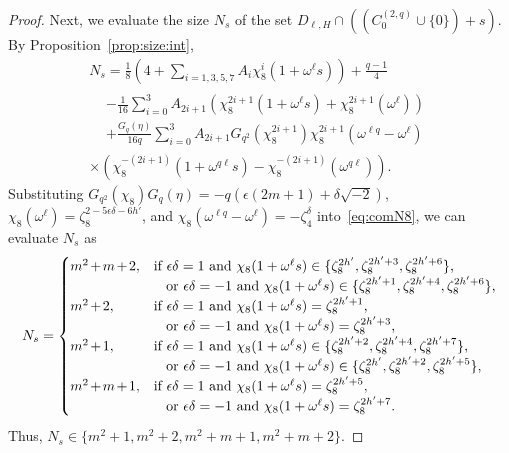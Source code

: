 \documentclass[10pt]{amsart}
\theoremstyle{definition}
\newcommand*{\Mk}{\mkern -2mu}
\begin{document}
\begin{proof}
Next, we evaluate the size $N_s$ of the set $D_{\ell,H}\cap ((C_0^{(2,q)}\cup \{0\})+s)$. By Proposition~\ref{prop:size:int},
\begin{multline}
N_s= \frac{1}{8}\left(4+\sum_{i=1,3,5,7}A_i\chi_8^i(1+\omega^\ell s)\right)+\frac{q-1}{4}\\
\begin{aligned}
&-\frac{1}{16}\sum_{i=0}^{3} A_{2i+1}(\chi_8^{2i+1}(1+\omega^\ell s)+\chi_8^{2i+1}(\omega^\ell))\\
&+\frac{G_q(\eta)}{16q}\sum_{i=0}^{3}A_{2i+1} G_{q^2}(\chi_8^{2i+1})\chi_8^{2i+1}(\omega^{\ell q}-\omega^\ell)
\end{aligned}\\
\times (\chi_8^{-(2i+1)}(1+\omega^{q\ell} s)-\chi_8^{-(2i+1)}(\omega^{q\ell})).\label{eq:comN8}
\end{multline}
Substituting $G_{q^2}(\chi_8)G_q(\eta)=-q(\epsilon (2m+1)+\delta \sqrt{-2})$, $\chi_8(\omega^\ell)=\zeta_8^{2-5\epsilon \delta-6h'}$, and $\chi_8(\omega^{\ell q}-\omega^\ell)=-\zeta_4^{\delta}$ into~\eqref{eq:comN8}, we can evaluate $N_s$ as
\begin{equation}\label{eq:dual8}
N_s=
\begin{cases}
m^2\Mk+\Mk m\Mk+\Mk2,& \text{if $\epsilon \delta=1$ and $\chi_8(1+\omega^\ell s)\in \{\zeta_8^{2h'},\zeta_8^{2h'+3},\zeta_8^{2h'+6}\}$,}\\
& \text{\;\; or $\epsilon \delta=-1$ and $\chi_8(1+\omega^\ell s)\in \{\zeta_8^{2h'+1},\zeta_8^{2h'+4},\zeta_8^{2h'+6}\}$,}\\
m^2\Mk+\Mk 2,& \text{if $\epsilon \delta=1$ and $\chi_8(1+\omega^\ell s)= \zeta_8^{2h'+1}$,}\\
& \text{\;\; or $\epsilon \delta=-1$ and $\chi_8(1+\omega^\ell s)= \zeta_8^{2h'+3}$,}\\
m^2\Mk+\Mk 1,& \text{if $\epsilon \delta=1$ and $\chi_8(1+\omega^\ell s)\in \{\zeta_8^{2h'+2},\zeta_8^{2h'+4},\zeta_8^{2h'+7}\}$, }\\
& \text{\;\; or $\epsilon \delta=-1$ and $\chi_8(1+\omega^\ell s)\in \{\zeta_8^{2h'},\zeta_8^{2h'+2},\zeta_8^{2h'+5}\}$,}\\
m^2\Mk+\Mk m\Mk+\Mk 1,& \text{if $\epsilon \delta=1$ and $\chi_8(1+\omega^\ell s)=\zeta_8^{2h'+5}$,}\\
& \text{\;\; or $\epsilon \delta=-1$ and $\chi_8(1+\omega^\ell s)=\zeta_8^{2h'+7}$.}
\end{cases}
\end{equation}
Thus, $N_s\in \{m^2+1,m^2+2,m^2+m+1,m^2+m+2\}$.
\end{proof}
\end{document}
